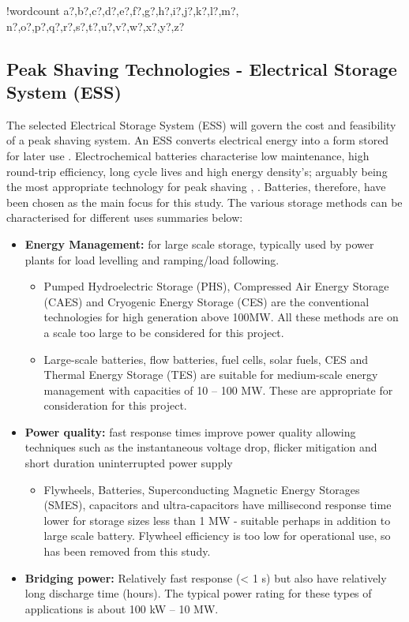 \documentclass[fontsize=9.5pt]{extarticle}
\numberwithin{figure}{section} %
\providecommand{\tightlist}{%
  \setlength{\itemsep}{0pt}\setlength{\parskip}{0pt}}
\newcounter{words}
\newenvironment{counted}{%
  \setcounter{words}{0}
  \SearchList!{wordcount}{\stepcounter{words}}
    {a?,b?,c?,d?,e?,f?,g?,h?,i?,j?,k?,l?,m?,
    n?,o?,p?,q?,r?,s?,t?,u?,v?,w?,x?,y?,z?}
  \UndoBoundary{'}
  \SearchOrder{p;}}{%
  \StopSearching}
\begin{document}
\begin{counted}
\subsection{Peak Shaving Technologies - Electrical Storage System
(ESS)}\label{peak-shaving-technologies---electrical-storage-system-ess}

The selected Electrical Storage System (ESS) will govern the cost and
feasibility of a peak shaving system. An ESS converts electrical energy
into a form stored for later use \cite{Chen2009291}. Electrochemical
batteries characterise low maintenance, high round-trip efficiency, long
cycle lives and high energy density's; arguably being the most
appropriate technology for peak shaving \cite{liao2016a},
\cite{Dunn928}. Batteries, therefore, have been chosen as the main focus
for this study. The various storage methods can be characterised for
different uses summaries below:

\begin{itemize}
\tightlist
\item
  \textbf{Energy Management:} for large scale storage, typically used by
  power plants for load levelling and ramping/load following.

  \begin{itemize}
  \tightlist
  \item
    Pumped Hydroelectric Storage (PHS), Compressed Air Energy Storage
    (CAES) and Cryogenic Energy Storage (CES) are the conventional
    technologies for high generation above 100MW. All these methods are
    on a scale too large to be considered for this project.
  \item
    Large-scale batteries, flow batteries, fuel cells, solar fuels, CES
    and Thermal Energy Storage (TES) are suitable for medium-scale
    energy management with capacities of 10 -- 100 MW. These are
    appropriate for consideration for this project.
  \end{itemize}
\item
  \textbf{Power quality:} fast response times improve power quality
  allowing techniques such as the instantaneous voltage drop, flicker
  mitigation and short duration uninterrupted power supply

  \begin{itemize}
  \tightlist
  \item
    Flywheels, Batteries, Superconducting Magnetic Energy Storages
    (SMES), capacitors and ultra-capacitors have millisecond response
    time lower for storage sizes less than 1 MW - suitable perhaps in
    addition to large scale battery. Flywheel efficiency is too low for
    operational use, so has been removed from this study.
  \end{itemize}
\item
  \textbf{Bridging power:} Relatively fast response (\textless{} 1 s)
  but also have relatively long discharge time (hours). The typical
  power rating for these types of applications is about 100 kW -- 10 MW.


\end{itemize}
\end{counted}
\end{document}
